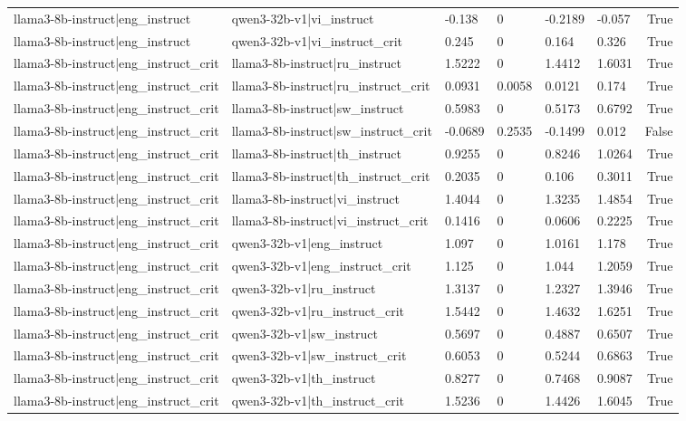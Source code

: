 \begin{table}
\begin{tabular}{llllllr}
llama3-8b-instruct|eng_instruct & qwen3-32b-v1|vi_instruct & -0.138 & 0 & -0.2189 & -0.057 & True \\
llama3-8b-instruct|eng_instruct & qwen3-32b-v1|vi_instruct_crit & 0.245 & 0 & 0.164 & 0.326 & True \\
llama3-8b-instruct|eng_instruct_crit & llama3-8b-instruct|ru_instruct & 1.5222 & 0 & 1.4412 & 1.6031 & True \\
llama3-8b-instruct|eng_instruct_crit & llama3-8b-instruct|ru_instruct_crit & 0.0931 & 0.0058 & 0.0121 & 0.174 & True \\
llama3-8b-instruct|eng_instruct_crit & llama3-8b-instruct|sw_instruct & 0.5983 & 0 & 0.5173 & 0.6792 & True \\
llama3-8b-instruct|eng_instruct_crit & llama3-8b-instruct|sw_instruct_crit & -0.0689 & 0.2535 & -0.1499 & 0.012 & False \\
llama3-8b-instruct|eng_instruct_crit & llama3-8b-instruct|th_instruct & 0.9255 & 0 & 0.8246 & 1.0264 & True \\
llama3-8b-instruct|eng_instruct_crit & llama3-8b-instruct|th_instruct_crit & 0.2035 & 0 & 0.106 & 0.3011 & True \\
llama3-8b-instruct|eng_instruct_crit & llama3-8b-instruct|vi_instruct & 1.4044 & 0 & 1.3235 & 1.4854 & True \\
llama3-8b-instruct|eng_instruct_crit & llama3-8b-instruct|vi_instruct_crit & 0.1416 & 0 & 0.0606 & 0.2225 & True \\
llama3-8b-instruct|eng_instruct_crit & qwen3-32b-v1|eng_instruct & 1.097 & 0 & 1.0161 & 1.178 & True \\
llama3-8b-instruct|eng_instruct_crit & qwen3-32b-v1|eng_instruct_crit & 1.125 & 0 & 1.044 & 1.2059 & True \\
llama3-8b-instruct|eng_instruct_crit & qwen3-32b-v1|ru_instruct & 1.3137 & 0 & 1.2327 & 1.3946 & True \\
llama3-8b-instruct|eng_instruct_crit & qwen3-32b-v1|ru_instruct_crit & 1.5442 & 0 & 1.4632 & 1.6251 & True \\
llama3-8b-instruct|eng_instruct_crit & qwen3-32b-v1|sw_instruct & 0.5697 & 0 & 0.4887 & 0.6507 & True \\
llama3-8b-instruct|eng_instruct_crit & qwen3-32b-v1|sw_instruct_crit & 0.6053 & 0 & 0.5244 & 0.6863 & True \\
llama3-8b-instruct|eng_instruct_crit & qwen3-32b-v1|th_instruct & 0.8277 & 0 & 0.7468 & 0.9087 & True \\
llama3-8b-instruct|eng_instruct_crit & qwen3-32b-v1|th_instruct_crit & 1.5236 & 0 & 1.4426 & 1.6045 & True \\

\end{tabular}
\end{table}

